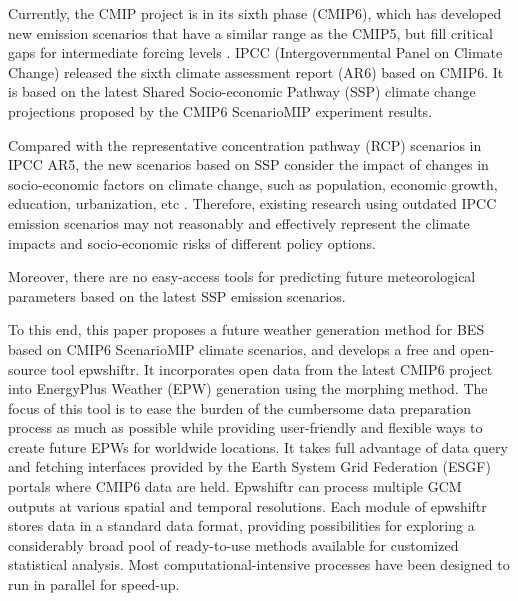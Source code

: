 \documentclass[twocolumn, a4paper,10pt]{article}
\makeatletter
\renewcommand\section{\@startsection{section}{1}{\z@}{3pt}{3pt}{\normalfont\large\bfseries}}
\makeatother
\begin{document}
Currently, the CMIP project is in its sixth phase (CMIP6), which has developed
new emission scenarios that have a similar range as the CMIP5, but fill critical
gaps for intermediate forcing levels \citep{oneill2016scenario}. IPCC
(Intergovernmental Panel on Climate Change) released the sixth climate
assessment report (AR6) based on CMIP6. It is based on the latest Shared
Socio-economic Pathway (SSP) climate change projections proposed by the CMIP6
ScenarioMIP experiment results.

Compared with the representative concentration pathway (RCP) scenarios in IPCC
AR5, the new scenarios based on SSP consider the impact of changes in
socio-economic factors on climate change, such as population, economic growth,
education, urbanization, etc \citep{chakraborty2021scenariobased}. Therefore,
existing research using outdated IPCC emission scenarios may not reasonably and
effectively represent the climate impacts and socio-economic risks of different
policy options.

Moreover, there are no easy-access tools for predicting future meteorological
parameters based on the latest SSP emission scenarios.

To this end, this paper proposes a future weather generation method for BES
based on CMIP6 ScenarioMIP climate scenarios, and develops a free and
open-source tool epwshiftr. It incorporates open data from the latest CMIP6
project into EnergyPlus Weather (EPW) generation using the morphing method. The
focus of this tool is to ease the burden of the cumbersome data preparation
process as much as possible while providing user-friendly and flexible ways to
create future EPWs for worldwide locations. It takes full advantage of data
query and fetching interfaces provided by the Earth System Grid Federation (ESGF)
portals where CMIP6 data are held. Epwshiftr can process multiple GCM outputs at
various spatial and temporal resolutions. Each module of epwshiftr stores data
in a standard data format, providing possibilities for exploring a considerably
broad pool of ready-to-use methods available for customized statistical
analysis. Most computational-intensive processes have been designed to run in
parallel for speed-up.

\hypertarget{climate-scenarios-in-cmip6-scenariomip}{%
\section{Climate scenarios in CMIP6 ScenarioMIP}\label{climate-scenarios-in-cmip6-scenariomip}}
\end{document}
